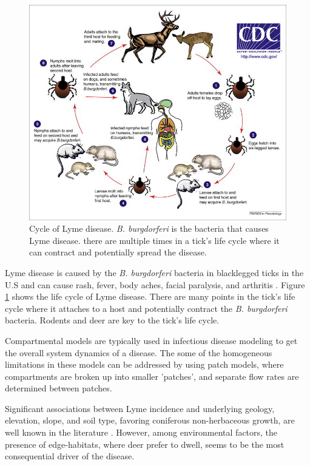 \documentclass{sigkddExp}
\begin{document}
\begin{figure}[hb!]
  \includegraphics[width=\linewidth]{cycle-of-lyme-disease.jpg}
  \caption{Cycle of Lyme disease. \textit{B. burgdorferi} is the bacteria that causes Lyme disease.
  there are multiple times in a tick's life cycle where it can contract and potentially spread the disease.}
  \label{fig:cycle_lyme}
\end{figure}

Lyme disease is caused by the \textit{B. burgdorferi} bacteria in blacklegged ticks in the U.S
and can cause rash, fever, body aches, facial paralysis, and arthritis \cite{cdc_faq}.
Figure \ref{fig:cycle_lyme} shows the life cycle of Lyme disease.
There are many points in the tick's life cycle where it attaches to a host and potentially contract the \textit{B. burgdorferi} bacteria.
Rodents and deer are key to the tick's life cycle.

Compartmental models are typically used in infectious disease modeling to get the overall system dynamics of a disease.
The some of the homogeneous limitations in these models can be addressed by using patch models,
where compartments are broken up into smaller 'patches', and separate flow rates are determined between patches.

Significant associations between Lyme incidence and underlying geology, elevation, slope, and soil type, favoring coniferous non-herbaceous growth, are well known in the literature \cite{glass1995}.
However, among environmental factors, the presence of edge-habitats,
where deer prefer to dwell, seems to be the most consequential driver of the disease.
\end{document}
